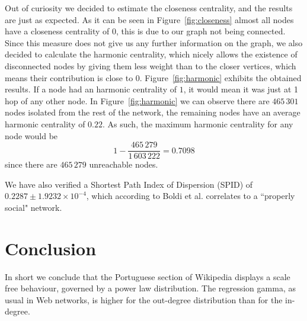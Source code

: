 \documentclass[9pt,a4paper,twocolumn]{article}
\begin{document}
Out of curiosity we decided to estimate the closeness centrality, and the results are just as expected. As it can be seen in Figure~\ref{fig:closeness} almost all nodes have a closeness centrality of 0, this is due to our graph not being connected. Since this measure does not give us any further information on the graph, we also decided to calculate the harmonic centrality, which nicely allows the existence of disconnected nodes by giving them less weight than to the closer vertices, which means their contribution is close to 0. Figure~\ref{fig:harmonic} exhibits the obtained results. If a node had an harmonic centrality of $1$, it would mean it was just at 1 hop of any other node. In Figure~\ref{fig:harmonic} we can observe there are $465\,301$ nodes isolated from the rest of the network, the remaining nodes have an average harmonic centrality of $0.22$. As such, the maximum harmonic centrality for any node would be $$1-\frac{465\,279}{1\,603\,222}=0.7098$$ since there are $465\,279$ unreachable nodes.

We have also verified a Shortest Path Index of Dispersion (SPID) of $0.2287 \pm 1.9232 \times 10^{-4}$, which according to Boldi et al. \cite{Boldi2011HyperANFAT} correlates to a ``properly social" network.

\section{Conclusion}

In short we conclude that the Portuguese section of Wikipedia displays a scale free behaviour, governed by a power law distribution. The regression gamma, as usual in Web networks, is higher for the out-degree distribution than for the in-degree.


\printglossary[type=\acronymtype]



\end{document}
